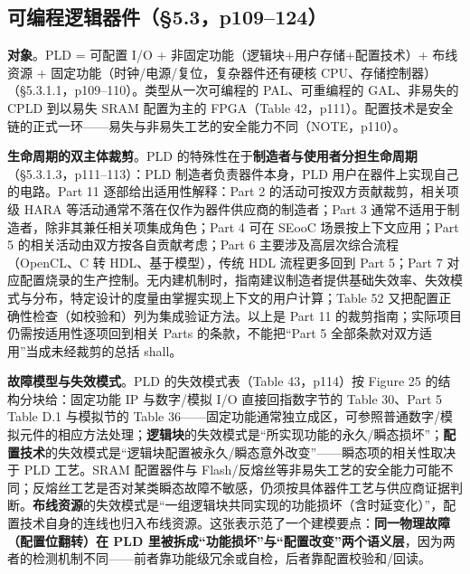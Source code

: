 \subsection{可编程逻辑器件（§5.3，p109–124）}

\textbf{对象}。PLD = 可配置 I/O + 非固定功能（逻辑块+用户存储+配置技术）+ 布线资源 + 固定功能（时钟/电源/复位，复杂器件还有硬核 CPU、存储控制器）（§5.3.1.1，p109–110）。类型从一次可编程的 PAL、可重编程的 GAL、非易失的 CPLD 到以易失 SRAM 配置为主的 FPGA（Table 42，p111）。配置技术是安全链的正式一环——易失与非易失工艺的安全能力不同（NOTE，p110）。

\textbf{生命周期的双主体裁剪}。PLD 的特殊性在于\textbf{制造者与使用者分担生命周期}（§5.3.1.3，p111–113）：PLD 制造者负责器件本身，PLD 用户在器件上实现自己的电路。Part 11 逐部给出适用性解释：Part 2 的活动可按双方贡献裁剪，相关项级 HARA 等活动通常不落在仅作为器件供应商的制造者；Part 3 通常不适用于制造者，除非其兼任相关项集成角色；Part 4 可在 SEooC 场景按上下文应用；Part 5 的相关活动由双方按各自贡献考虑；Part 6 主要涉及高层次综合流程（OpenCL、C 转 HDL、基于模型），传统 HDL 流程更多回到 Part 5；Part 7 对应配置烧录的生产控制。无内建机制时，指南建议制造者提供基础失效率、失效模式与分布，特定设计的度量由掌握实现上下文的用户计算；Table 52 又把配置正确性检查（如校验和）列为集成验证方法。以上是 Part 11 的裁剪指南；实际项目仍需按适用性逐项回到相关 Parts 的条款，不能把“Part 5 全部条款对双方适用”当成未经裁剪的总括 shall。

\textbf{故障模型与失效模式}。PLD 的失效模式表（Table 43，p114）按 Figure 25 的结构分块给：固定功能 IP 与数字/模拟 I/O 直接回指数字节的 Table 30、Part 5 Table D.1 与模拟节的 Table 36——固定功能通常独立成区，可参照普通数字/模拟元件的相应方法处理；\textbf{逻辑块}的失效模式是“所实现功能的永久/瞬态损坏”；\textbf{配置技术}的失效模式是“逻辑块配置被永久/瞬态意外改变”——瞬态项的相关性取决于 PLD 工艺。SRAM 配置器件与 Flash/反熔丝等非易失工艺的安全能力可能不同；反熔丝工艺是否对某类瞬态故障不敏感，仍须按具体器件工艺与供应商证据判断。\textbf{布线资源}的失效模式是“一组逻辑块共同实现的功能损坏（含时延变化）”，配置技术自身的连线也归入布线资源。这张表示范了一个建模要点：\textbf{同一物理故障（配置位翻转）在 PLD 里被拆成“功能损坏”与“配置改变”两个语义层}，因为两者的检测机制不同——前者靠功能级冗余或自检，后者靠配置校验和/回读。

